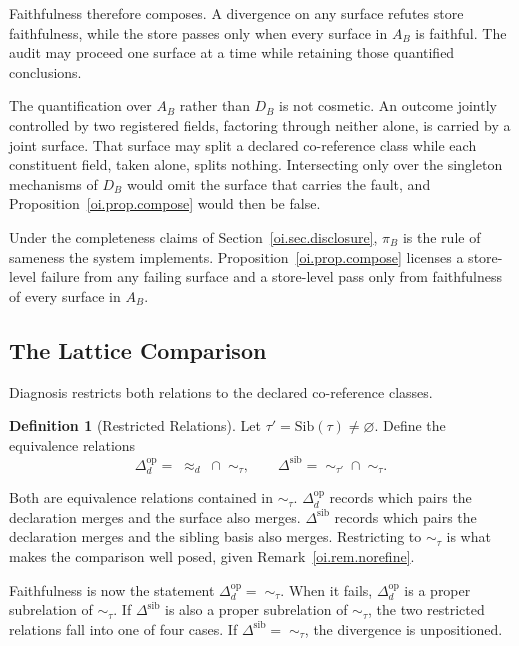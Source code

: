 \documentclass[11pt]{article}
\theoremstyle{plain}
\theoremstyle{definition}
\newtheorem{definition}[theorem]{Definition}
\theoremstyle{remark}
\newcommand{\Sib}{\ensuremath{\mathrm{Sib}}}
\newcommand{\Ker}{\ensuremath{\mathrel{\approx_{d}}}}
\newcommand{\Dop}{\ensuremath{\Delta^{\mathrm{op}}_{d}}}
\newcommand{\Dsib}{\ensuremath{\Delta^{\mathrm{sib}}}}
\begin{document}
Faithfulness therefore composes.
A divergence on any surface refutes store faithfulness,
while the store passes only when every surface in \(A_B\) is faithful.
The audit may proceed one surface at a time
while retaining those quantified conclusions.

The quantification over \(A_B\) rather than \(D_B\) is not cosmetic.
An outcome jointly controlled by two registered fields, factoring through neither alone, is carried by a joint surface.
That surface may split a declared co-reference class
while each constituent field, taken alone, splits nothing.
Intersecting only over the singleton mechanisms of \(D_B\)
would omit the surface that carries the fault,
and Proposition~\ref{oi.prop.compose} would then be false.

Under the completeness claims of Section~\ref{oi.sec.disclosure},
\(\pi_B\) is the rule of sameness the system implements.
Proposition~\ref{oi.prop.compose} licenses a store-level failure
from any failing surface and a store-level pass
only from faithfulness of every surface in \(A_B\).

\subsection{The Lattice Comparison}

Diagnosis restricts both relations to the declared co-reference classes.

\begin{definition}[Restricted Relations]
  \label{oi.def.restricted}
  Let \(\tau'=\Sib(\tau)\neq\varnothing\).
  Define the equivalence relations
  \[
    \Dop
    =
    \;\Ker\;\cap\;\sim_{\tau},
    \qquad
    \Dsib
    =
    \;\sim_{\tau'}\;\cap\;\sim_{\tau}.
  \]
\end{definition}

Both are equivalence relations contained in \(\sim_{\tau}\).
\(\Dop\) records which pairs the declaration merges
and the surface also merges.
\(\Dsib\) records which pairs the declaration merges
and the sibling basis also merges.
Restricting to \(\sim_{\tau}\) is what makes the comparison well posed,
given Remark~\ref{oi.rem.norefine}.

Faithfulness is now the statement \(\Dop=\;\sim_{\tau}\).
When it fails, \(\Dop\) is a proper subrelation of \(\sim_{\tau}\).
If \(\Dsib\) is also a proper subrelation of \(\sim_{\tau}\),
the two restricted relations fall into one of four cases.
If \(\Dsib=\;\sim_{\tau}\),
the divergence is unpositioned.
\end{document}
